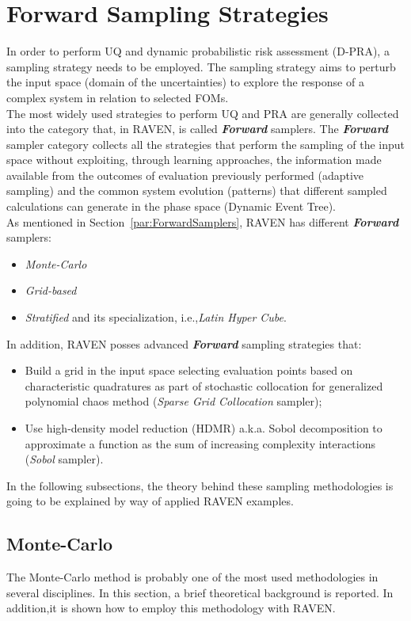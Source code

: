 \section{Forward Sampling Strategies}
\label{sec:forwardSamplingStrategies}
In order to perform UQ and dynamic
probabilistic risk assessment (D-PRA),
a sampling strategy needs to be employed. The sampling strategy aims to
perturb the input space (domain of the uncertainties) to explore
the response of a complex system in relation to selected FOMs. 
\\The most widely used strategies to perform UQ and PRA are generally
collected into the category that, in RAVEN, is called \textit{\textbf{Forward}} samplers. The \textit{\textbf{Forward}} sampler category collects all the strategies that perform the sampling of the input space without exploiting, through learning approaches, the information made available from the outcomes of evaluation previously performed (adaptive sampling) and the common system evolution (patterns) that different sampled calculations can generate in the phase space (Dynamic Event Tree). 
\\As mentioned in Section~\ref{par:ForwardSamplers}, RAVEN has
different \textit{\textbf{Forward}} samplers:
\begin{itemize}
  \item \textit{Monte-Carlo}
  \item \textit{Grid-based}
  \item \textit{Stratified} and its specialization, i.e.,\textit{Latin Hyper Cube}.
\end{itemize}
In addition, RAVEN posses advanced \textit{\textbf{Forward}} sampling strategies that:
\begin{itemize}
  \item Build a grid in the input space selecting evaluation points 
  based on characteristic quadratures as part of stochastic collocation 
  for generalized polynomial chaos method (\textit{Sparse 
  Grid Collocation} sampler);
  \item Use high-density model reduction (HDMR) a.k.a. Sobol 
  decomposition to approximate a function as the sum of increasing
  complexity interactions (\textit{Sobol} sampler).
\end{itemize} 
In the following subsections, the theory behind these sampling 
methodologies is going to be explained by way of applied RAVEN 
examples.
\subsection{Monte-Carlo}
\label{sub:MC}
The Monte-Carlo method is probably one of the most used methodologies in several disciplines. In this section, a brief theoretical 
background is reported. In addition,it is shown how to employ this methodology with RAVEN.
